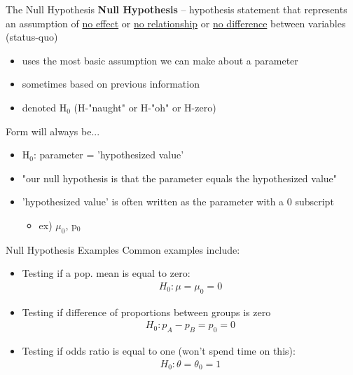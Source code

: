 \documentclass{beamer}
\begin{document}
\begin{frame}{The Null Hypothesis}
\textbf{Null Hypothesis} -- hypothesis statement that represents an assumption of \underline{no effect} or \underline{no relationship} or \underline{no difference} between variables (status-quo)
\begin{itemize}
    \item uses the most basic assumption we can make about a parameter
    \item sometimes based on previous information
    \item denoted H$_0$ (H-"naught" or H-"oh" or H-zero)
\end{itemize} \vspace{8mm}

Form will always be...
\begin{itemize}
    \item H$_0$: parameter = 'hypothesized value'
    \item "our null hypothesis is that the parameter equals the hypothesized value"
    \item 'hypothesized value' is often written as the parameter with a 0 subscript
    \begin{itemize}
        \item ex) $\mu_0$, p$_0$
    \end{itemize}
\end{itemize}
\end{frame}

\begin{frame}{Null Hypothesis Examples}
Common examples include: \vspace{3mm}
\begin{itemize}
\item Testing if a pop. mean is equal to zero:
\begin{align*}
H_0: \mu = \mu_0 = 0
\end{align*}
\item Testing if difference of proportions between groups is zero
\begin{align*}
H_0: p_A - p_B = p_0 = 0
\end{align*}
\item Testing if odds ratio is equal to one (won't spend time on this):
\begin{align*}
H_0: \theta = \theta_0 = 1
\end{align*}
\end{itemize}
\end{frame}
\end{document}
